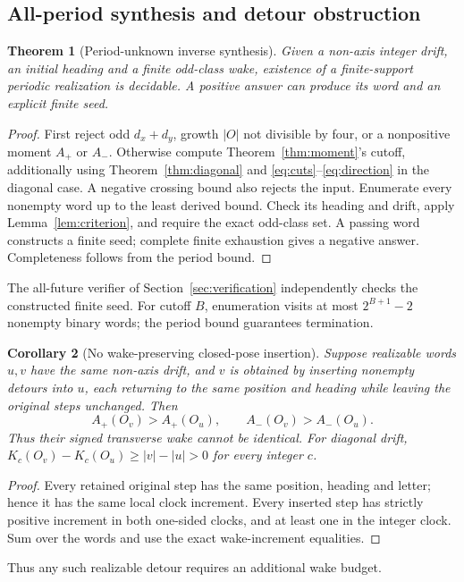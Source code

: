 \documentclass[11pt]{article}
\newtheorem{theorem}{Theorem}[section]
\newtheorem{corollary}[theorem]{Corollary}
\theoremstyle{definition}\newtheorem{definition}[theorem]{Definition}
\begin{document}
\subsection{All-period synthesis and detour obstruction}
\begin{theorem}[Period-unknown inverse synthesis]\label{thm:inverse}
Given a non-axis integer drift, an initial heading and a finite odd-class wake,
existence of a finite-support periodic realization is decidable. A positive
answer can produce its word and an explicit finite seed.
\end{theorem}
\begin{proof}
First reject odd $d_x+d_y$, growth $|O|$ not divisible by four, or a
nonpositive moment $A_+$ or $A_-$. Otherwise compute
Theorem~\ref{thm:moment}'s cutoff, additionally using
Theorem~\ref{thm:diagonal} and \eqref{eq:cuts}--\eqref{eq:direction} in the
diagonal case. A negative crossing bound also rejects the input.
Enumerate every nonempty word up to the least derived bound.
Check its heading and drift, apply Lemma~\ref{lem:criterion}, and require the
exact odd-class set. A passing word constructs a finite seed; complete finite
exhaustion gives a negative answer. Completeness follows from the period bound.
\end{proof}
The all-future verifier of Section~\ref{sec:verification} independently
checks the constructed finite seed. For cutoff $B$, enumeration visits at
most $2^{B+1}-2$ nonempty binary words; the period bound guarantees termination.

\begin{corollary}[No wake-preserving closed-pose insertion]
Suppose realizable words $u,v$ have the same non-axis drift, and $v$ is obtained
by inserting nonempty detours into $u$, each returning to the same position and
heading while leaving the original steps unchanged. Then
\[
 A_+(O_v)>A_+(O_u),\qquad A_-(O_v)>A_-(O_u).
\]
Thus their signed transverse wake cannot be identical. For diagonal drift,
$K_c(O_v)-K_c(O_u)\ge |v|-|u|>0$ for every integer $c$.
\end{corollary}
\begin{proof}
Every retained original step has the same position, heading and letter; hence
it has the same local clock increment. Every inserted step has strictly positive
increment in both one-sided clocks, and at least one in the integer clock.
Sum over the words and use the exact wake-increment equalities.
\end{proof}
Thus any such realizable detour requires an additional wake budget.
\end{document}
